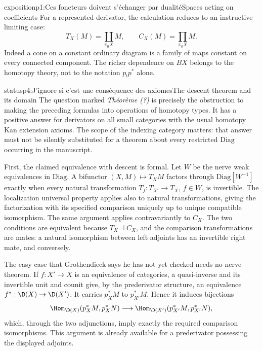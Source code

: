 \begin{dcomment}{exposition}{p1:Ces foncteurs doivent s'échanger par dualité}{Spaces acting on coefficients}
For a represented derivator, the calculation reduces to an instructive limiting case:
\[
 T_X(M)=\coprod_{\pi_0 X}M,\qquad
 C_X(M)=\prod_{\pi_0 X}M.
\]
Indeed a cone on a constant ordinary diagram is a family of maps constant on every connected component. The richer dependence on \(B X\) belongs to the homotopy theory, not to the notation \(p_!p^*\) alone.
\end{dcomment}

\begin{dcomment}{status}{p4:J'ignore si c'est une conséquence des axiomes}{The descent theorem and its domain}
The question marked \emph{Théorème (?)} is precisely the obstruction to making the preceding formulas into operations of homotopy types. It has a positive answer for derivators on all small categories with the usual homotopy Kan extension axioms. The scope of the indexing category matters: that answer must not be silently substituted for a theorem about every restricted \(\mathrm{Diag}\) occurring in the manuscript.

First, the claimed equivalence with descent is formal. Let \(W\) be the nerve weak equivalences in \(\mathrm{Diag}\). A bifunctor \((X,M)\mapsto T_XM\) factors through \(\mathrm{Diag}[W^{-1}]\) exactly when every natural transformation \(T_f:T_{X'}\to T_X\), \(f\in W\), is invertible. The localization universal property applies also to natural transformations, giving the factorization with its specified comparison uniquely up to unique compatible isomorphism. The same argument applies contravariantly to \(C_X\). The two conditions are equivalent because \(T_X\dashv C_X\), and the comparison transformations are mates: a natural isomorphism between left adjoints has an invertible right mate, and conversely.

The easy case that Grothendieck says he has not yet checked needs no nerve theorem. If \(f:X'\to X\) is an equivalence of categories, a quasi-inverse and its invertible unit and counit give, by the prederivator structure, an equivalence \(f^*:\D(X)\to\D(X')\). It carries \(p_X^*M\) to \(p_{X'}^*M\). Hence it induces bijections
\[
 \Hom_{\D(X)}(p_X^*M,p_X^*N)
 \longrightarrow
 \Hom_{\D(X')}(p_{X'}^*M,p_{X'}^*N),
\]
which, through the two adjunctions, imply exactly the required comparison isomorphisms. This argument is already available for a prederivator possessing the displayed adjoints.


\end{dcomment}
